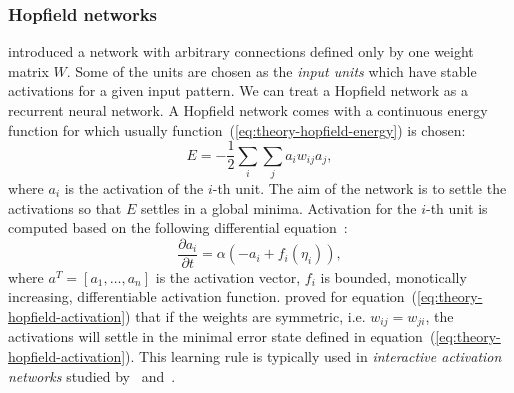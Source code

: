 \subsubsection{Hopfield networks}
\label{sec:theory-hopfield}

\citet{hopfield1984neurons} introduced a network with arbitrary connections defined only by one weight matrix $W$. Some of the units are chosen as the \emph{input units} which have stable activations for a given input pattern. We can treat a Hopfield network as a recurrent neural network. A Hopfield network comes with a continuous energy function for which usually function~(\ref{eq:theory-hopfield-energy}) is chosen: 
\begin{equation}
  \label{eq:theory-hopfield-energy}
  E = -\frac{1}{2}\sum_i\sum_ja_iw_{ij}a_j,
\end{equation} 
where $a_i$ is the activation of the $i$-th unit. The aim of the network is to settle the activations so that $E$ settles in a global minima. Activation for the $i$-th unit is computed based on the following differential equation~\citep{hopfield1984neurons}: 
\begin{equation}
  \label{eq:theory-hopfield-activation}
  \frac{\partial a_i}{\partial t} = \alpha(-a_i + f_i(\eta_i)),
\end{equation} 
where $a^T = [a_1,\ldots,a_n]$ is the activation vector, $f_i$ is bounded, monotically increasing, differentiable activation function. \citet{hopfield1984neurons} proved for equation~(\ref{eq:theory-hopfield-activation}) that if the weights are symmetric, i.e. $w_{ij} = w_{ji}$, the activations will settle in the minimal error state defined in equation~(\ref{eq:theory-hopfield-activation}). This learning rule is typically used in \emph{interactive activation networks} studied by~\citet{grossberg1978theory} and~\citet{mcclelland1981interactive}. 

